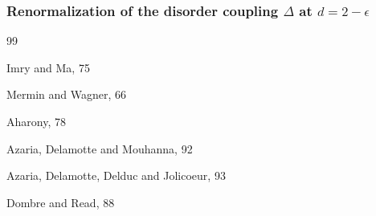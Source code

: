 \documentclass[notitlepage,onecolumn,showpacs,11pt]{revtex4-1}
\begin{document}
\subsubsection{Renormalization of the disorder coupling $\Delta$ at $d=2-\epsilon$}

\begin{thebibliography}{99}

        Imry and Ma, 75

        Mermin and Wagner, 66

        Aharony, 78

        Azaria, Delamotte and Mouhanna, 92

        Azaria, Delamotte, Delduc and Jolicoeur, 93

        Dombre and Read, 88

\end{thebibliography}
\end{document}
